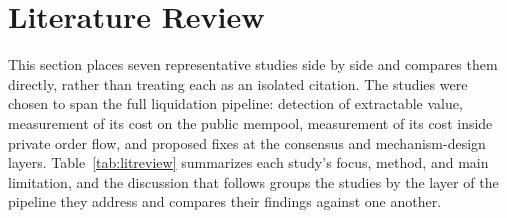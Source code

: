 \documentclass{llncs}
\begin{document}
\section{Literature Review}
\label{sec:litreview}

This section places seven representative studies side by side and
compares them directly, rather than treating each as an isolated
citation. The studies were chosen to span the full liquidation
pipeline: detection of extractable value, measurement of its cost on
the public mempool, measurement of its cost inside private order flow,
and proposed fixes at the consensus and mechanism-design layers.
Table~\ref{tab:litreview} summarizes each study's focus, method, and
main limitation, and the discussion that follows groups the studies by
the layer of the pipeline they address and compares their findings
against one another.
\end{document}
